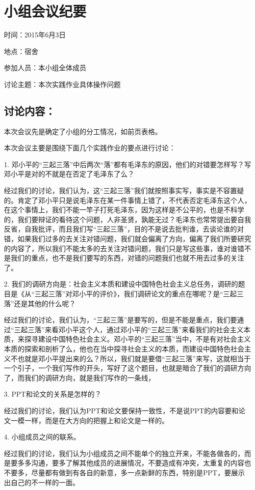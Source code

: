\documentclass[cs4size,a4paper,nofonts,twoside]{ctexart}
\begin{document}
\cleardoublepage
\setcounter{page}{1}

\section*{小组会议纪要}

时间：2015年6月3日

地点：宿舍

参加人员：本小组全体成员

讨论主题：本次实践作业具体操作问题

\subsection*{讨论内容：}

本次会议先是确定了小组的分工情况，如前页表格。

本次会议主要是围绕下面几个实践作业的要点进行讨论：

1. 邓小平的“三起三落”中后两次“落”都有毛泽东的原因，他们的对错要怎样写？写邓小平是对的不就是在否定了毛泽东了么？

经过我们的讨论，我们认为，这“三起三落”我们就按照事实写，事实是不容置疑的。肯定了邓小平只是说毛泽东在某一件事情上错了，不代表否定毛泽东这个人，在这个事情上，我们不能一竿子打死毛泽东，因为这样是不公平的，也是不科学的，我们要辩证的看待这个问题，人非圣贤，孰能无过？毛泽东也常常提出要自我反省，自我批评，而且我们写“三起三落”，目的不是说去批判谁，去谈论谁的对错，如果我们过多的去关注对错问题，我们就会偏离了方向，偏离了我们所要研究的内容了，所以我们不能太多的去关注对错问题，我们只是写这些事，谁对谁错不是我们的重点，也不是我们要写的东西，对错的问题我们也就不用去过多的关注了。

2. 我们的调研方向是：社会主义本质和建设中国特色社会主义总任务，调研的题目是《从“三起三落”对邓小平的评价》，我们调研论文的重点在哪呢？是“三起三落”还是其他的什么呢？

经过我们的讨论，我们认为，“三起三落”是要写的，但是不能是重点，我们要通过“三起三落”来看邓小平这个人，通过邓小平的“三起三落”来看我们的社会主义本质，来探寻建设中国特色社会主义。邓小平的“三起三落”当中，不是有对社会主义本质的探索和剖析了么，他也在当中探寻社会主义的本质，而建设中国特色社会主义不也就是邓小平提出来的么？所以，我们就是要借“三起三落”来写，这就相当于一个引子，一个我们写作的开头，写好了这个题目，也就是暗合了我们的调研方向了，而我们的调研方向，就是我们写作的一条线，

3. PPT和论文的关系是怎样的？

经过我们的讨论，我们认为PPT和论文要保持一致性，不是说PPT的内容要和论文一模一样，而是在大方向的把握上和论文是一样的。

4. 小组成员之间的联系。

经过我们的讨论，我们认为小组成员之间不能单个的独立开来，不能各做各的，而是要多多沟通，要多了解其他成员的进展情况，不要造成有冲突，太重复的内容也不要多，尽量都有做到有各自的新意，多一点新鲜的东西，特别是PPT，要展示出自己的不一样的一面。

\cleardoublepage



\end{document}
